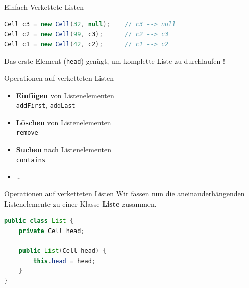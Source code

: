 \documentclass[18pt]{beamer}
\begin{document}
\begin{frame}[fragile]{Einfach Verkettete Listen}

    \begin{exampleblock}{}
        \begin{lstlisting}[language=Java,basicstyle=\scriptsize]
Cell c3 = new Cell(32, null);    // c3 --> null
Cell c2 = new Cell(99, c3);      // c2 --> c3
Cell c1 = new Cell(42, c2);      // c1 --> c2
        \end{lstlisting}
    \end{exampleblock}

\vspace{.2in}

\pause

Das erste Element (\texttt{head}) genügt, um komplette Liste zu durchlaufen !

\end{frame}


\begin{frame}{Operationen auf verketteten Listen}
    \begin{itemize}
        \item \textbf{Einfügen} von Listenelementen\\
        \texttt{addFirst}, \texttt{addLast}
        \item \textbf{Löschen} von Listenelementen\\
        \texttt{remove}
        \item \textbf{Suchen} nach Listenelementen\\
        \texttt{contains}
        \item \dots
    \end{itemize}
\end{frame}

\begin{frame}[fragile]{Operationen auf verketteten Listen}
    Wir fassen nun die aneinanderhängenden Listenelemente zu einer Klasse \textbf{Liste} zusammen.

    \begin{exampleblock}{}
        \begin{lstlisting}[language=Java,basicstyle=\scriptsize]
public class List {
    private Cell head;

    public List(Cell head) {
        this.head = head;
    }
}
        \end{lstlisting}

    \end{exampleblock}


\end{frame}
\end{document}
